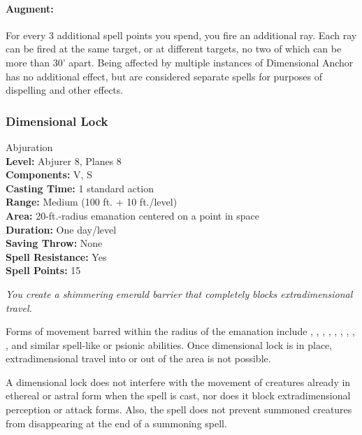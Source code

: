 \paragraph{Augment:} For every 3 additional spell points you spend, you fire an additional ray. Each ray can be fired at the same target, or at different targets, no two of which can be more than 30' apart. Being affected by multiple instances of Dimensional Anchor has no additional effect, but are considered separate spells for purposes of dispelling and other effects.
\subsubsection{Dimensional Lock}
\label{Spell:DimensionalLock}
Abjuration
\\ \textbf{Level:} Abjurer 8, Planes 8
\\ \textbf{Components:} V, S
\\ \textbf{Casting Time:} 1 standard action
\\ \textbf{Range:} Medium (100 ft. + 10 ft./level)
\\ \textbf{Area:} 20-ft.-radius emanation centered on a point in space
\\ \textbf{Duration:} One day/level
\\ \textbf{Saving Throw:} None
\\ \textbf{Spell Resistance:} Yes
\\ \textbf{Spell Points:} 15

\emph{You create a shimmering emerald barrier that completely blocks extradimensional travel. }

Forms of movement barred within the radius of the emanation include , , , 
, , , , , , 
and similar spell-like or psionic abilities. 
Once dimensional lock is in place, extradimensional travel into or out of the area is not possible.

A dimensional lock does not interfere with the movement of creatures already in ethereal or astral form when the spell is cast, 
nor does it block extradimensional perception or attack forms. 
Also, the spell does not prevent summoned creatures from disappearing at the end of a summoning spell.

